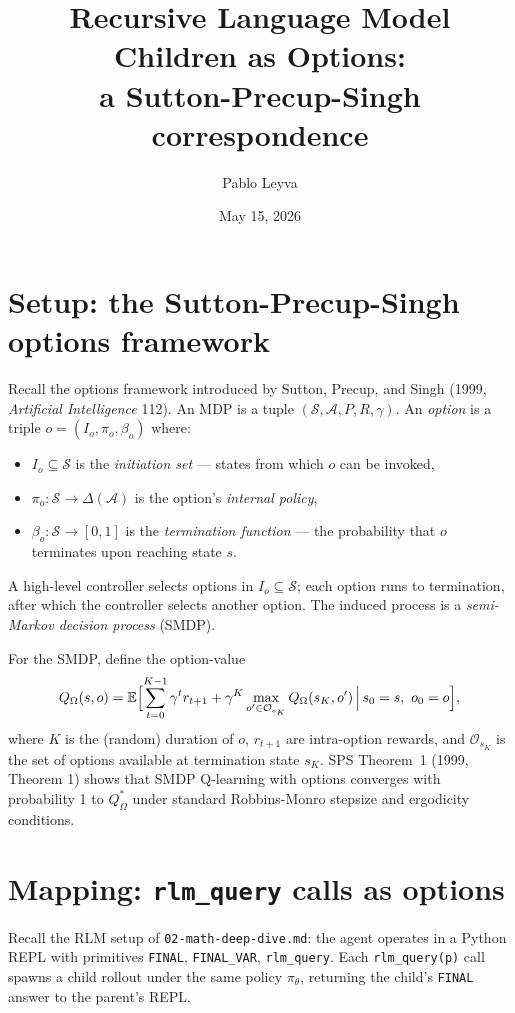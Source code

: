 \documentclass[11pt]{article}
\title{Recursive Language Model Children as Options:\\
       a Sutton-Precup-Singh correspondence}
\author{Pablo Leyva}
\date{May 15, 2026}
\begin{document}
\maketitle

\section*{Setup: the Sutton-Precup-Singh options framework}

Recall the options framework introduced by Sutton, Precup, and Singh (1999,
\emph{Artificial Intelligence} 112). An MDP is a tuple
$(\mathcal{S}, \mathcal{A}, P, R, \gamma)$. An \emph{option} is a triple
$o = (I_o, \pi_o, \beta_o)$ where:
\begin{itemize}
\item $I_o \subseteq \mathcal{S}$ is the \emph{initiation set} --- states from
      which $o$ can be invoked,
\item $\pi_o : \mathcal{S} \to \Delta(\mathcal{A})$ is the option's
      \emph{internal policy},
\item $\beta_o : \mathcal{S} \to [0, 1]$ is the \emph{termination function} ---
      the probability that $o$ terminates upon reaching state $s$.
\end{itemize}
A high-level controller selects options in $I_o \subseteq \mathcal{S}$;
each option runs to termination, after which the controller selects another
option. The induced process is a \emph{semi-Markov decision process} (SMDP).

For the SMDP, define the option-value
\[
Q_\Omega(s, o) = \mathbb{E}\Bigl[\sum_{t=0}^{K-1} \gamma^t r_{t+1} + \gamma^K
                 \max_{o' \in \mathcal{O}_{s_K}} Q_\Omega(s_K, o')
                 \,\Big|\, s_0 = s,\ o_0 = o\Bigr],
\]
where $K$ is the (random) duration of $o$, $r_{t+1}$ are intra-option rewards,
and $\mathcal{O}_{s_K}$ is the set of options available at termination state
$s_K$. SPS Theorem~1 (1999, Theorem 1) shows that SMDP Q-learning with
options converges with probability 1 to $Q_\Omega^*$ under standard
Robbins-Monro stepsize and ergodicity conditions.

\section*{Mapping: \texttt{rlm\_query} calls as options}

Recall the RLM setup of \texttt{02-math-deep-dive.md}: the agent operates in a
Python REPL with primitives \texttt{FINAL}, \texttt{FINAL\_VAR},
\texttt{rlm\_query}. Each \texttt{rlm\_query(p)} call spawns a child rollout
under the same policy $\pi_\theta$, returning the child's \texttt{FINAL}
answer to the parent's REPL.
\end{document}
